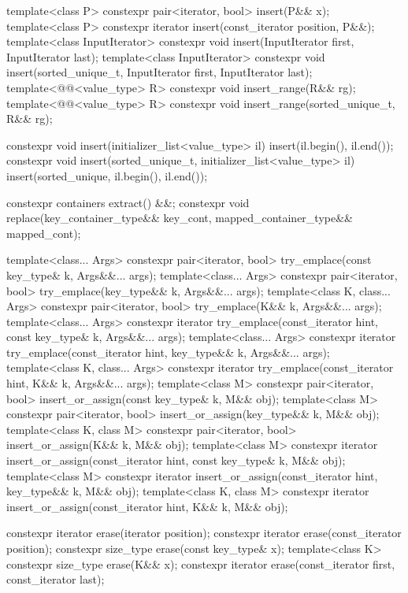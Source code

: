 \begin{codeblock}
{{    template<class P> constexpr pair<iterator, bool> insert(P&& x);
    template<class P>
      constexpr iterator insert(const_iterator position, P&&);
    template<class InputIterator>
      constexpr void insert(InputIterator first, InputIterator last);
    template<class InputIterator>
      constexpr void insert(sorted_unique_t, InputIterator first, InputIterator last);
    template<@@<value_type> R>
      constexpr void insert_range(R&& rg);
    template<@@<value_type> R>
      constexpr void insert_range(sorted_unique_t, R&& rg);

    constexpr void insert(initializer_list<value_type> il)
      { insert(il.begin(), il.end()); }
    constexpr void insert(sorted_unique_t, initializer_list<value_type> il)
      { insert(sorted_unique, il.begin(), il.end()); }

    constexpr containers extract() &&;
    constexpr void replace(key_container_type&& key_cont, mapped_container_type&& mapped_cont);

    template<class... Args>
      constexpr pair<iterator, bool> try_emplace(const key_type& k, Args&&... args);
    template<class... Args>
      constexpr pair<iterator, bool> try_emplace(key_type&& k, Args&&... args);
    template<class K, class... Args>
      constexpr pair<iterator, bool> try_emplace(K&& k, Args&&... args);
    template<class... Args>
      constexpr iterator try_emplace(const_iterator hint, const key_type& k, Args&&... args);
    template<class... Args>
      constexpr iterator try_emplace(const_iterator hint, key_type&& k, Args&&... args);
    template<class K, class... Args>
      constexpr iterator try_emplace(const_iterator hint, K&& k, Args&&... args);
    template<class M>
      constexpr pair<iterator, bool> insert_or_assign(const key_type& k, M&& obj);
    template<class M>
      constexpr pair<iterator, bool> insert_or_assign(key_type&& k, M&& obj);
    template<class K, class M>
      constexpr pair<iterator, bool> insert_or_assign(K&& k, M&& obj);
    template<class M>
      constexpr iterator insert_or_assign(const_iterator hint, const key_type& k, M&& obj);
    template<class M>
      constexpr iterator insert_or_assign(const_iterator hint, key_type&& k, M&& obj);
    template<class K, class M>
      constexpr iterator insert_or_assign(const_iterator hint, K&& k, M&& obj);

    constexpr iterator erase(iterator position);
    constexpr iterator erase(const_iterator position);
    constexpr size_type erase(const key_type& x);
    template<class K> constexpr size_type erase(K&& x);
    constexpr iterator erase(const_iterator first, const_iterator last);

}}
\end{codeblock}
